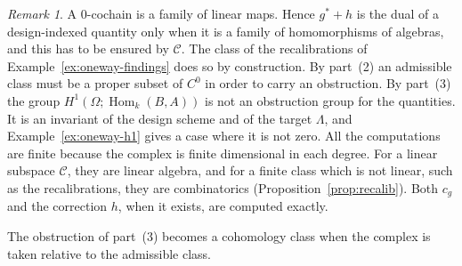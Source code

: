 \documentclass[11pt,a4paper]{article}
\theoremstyle{plain}
\theoremstyle{definition}
\theoremstyle{remark}
\newtheorem{remark}[theorem]{Remark}
\newcommand{\cat}[1]{\mathsf{#1}}
\newcommand{\catO}{\cat{\Omega}}
\DeclareMathOperator{\Hom}{Hom}
\begin{document}
\begin{remark}\label{rem:obstruction}
A $0$-cochain is a family of linear maps. Hence $g^{*}+h$ is the dual of a
design-indexed quantity only when it is a family of homomorphisms of algebras,
and this has to be ensured by $\mathcal{C}$. The class of the recalibrations
of Example~\ref{ex:oneway-findings} does so by construction. By part~(2) an
admissible class must be a proper subset of $C^{0}$ in order to carry an
obstruction. By part~(3) the group $H^{1}(\catO;\Hom_k(B,A))$ is not an
obstruction group for the quantities. It is an invariant of the design scheme
and of the target $\Lambda$, and Example~\ref{ex:oneway-h1} gives a case where
it is not zero. All the computations are finite because the complex is finite
dimensional in each degree. For a linear subspace $\mathcal{C}$, they are
linear algebra, and for a finite class which is not linear, such as the
recalibrations, they are combinatorics (Proposition~\ref{prop:recalib}). Both
$c_g$ and the correction $h$, when it exists, are computed exactly.
\end{remark}

The obstruction of part~(3) becomes a cohomology class when the complex is
taken relative to the admissible class.
\end{document}
